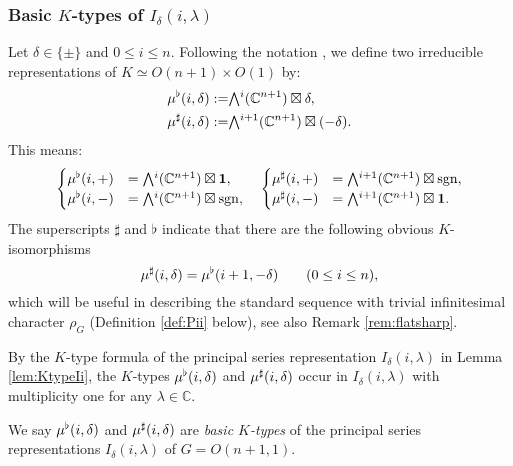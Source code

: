 \subsubsection{Basic $K$-types of $I_{\delta}(i,\lambda)$}
\label{subsec:KIilmd}
Let $\delta \in \{ \pm \}$
 and $0 \le i\le n$.  
Following the notation \cite[Chap.~2, Sect.~3]{KKP}, 
 we define two irreducible representations
 of $K\simeq O(n+1) \times O(1)$ by:
\begin{align}
   \mub(i,\delta):=& \Exterior^i({\mathbb{C}}^{n+1}) \boxtimes \delta, 
\label{eqn:muflat}
\\
   \mus(i,\delta):=& \Exterior^{i+1}({\mathbb{C}}^{n+1}) \boxtimes (-\delta).  
\label{eqn:musharp}
\end{align}
This means:
\[
 \begin{cases}
\mub(i,+)&=\Exterior^i({\mathbb{C}}^{n+1}) \boxtimes {\bf{1}},
\\
\mub(i,-)
&=\Exterior^i({\mathbb{C}}^{n+1})\boxtimes {\operatorname{sgn}},
   \end{cases}
\quad
\begin{cases}
\mus(i,+)
&=\Exterior^{i+1}({\mathbb{C}}^{n+1}) \boxtimes {\operatorname{sgn}}, 
\\
\mus(i,-)
&=\Exterior^{i+1}({\mathbb{C}}^{n+1}) \boxtimes {\bf{1}}.  
\end{cases}
\]
The superscripts $\sharp$ and $\flat$ indicate
 that there are the following obvious $K$-isomorphisms
\begin{equation}
\label{eqn:flatsharp}
   \mu^{\sharp}(i,\delta)=\mu^{\flat}(i+1,-\delta)
   \qquad
   (0 \le i \le n), 
\end{equation}
which will be useful
 in describing the standard sequence
 with trivial infinitesimal character $\rho_G$
 (Definition \ref{def:Pii} below), 
 see also Remark \ref{rem:flatsharp}.  



By the $K$-type formula of the principal series representation 
 $I_{\delta}(i,\lambda)$ in Lemma \ref{lem:KtypeIi}, 
 the $K$-types $\mu^{\flat}(i,\delta)$ and $\mu^{\sharp}(i,\delta)$
 occur in $I_{\delta}(i,\lambda)$
 with multiplicity one for any $\lambda \in {\mathbb{C}}$.  

\begin{definition}
\label{def:basicK}
We say $\mu^{\flat} (i,\delta)$ and $\mu^{\sharp} (i,\delta)$
 are {\it{basic $K$-types}}
 of the principal series representations $I_{\delta}(i,\lambda)$
 of $G=O(n+1,1)$.  
\end{definition}

